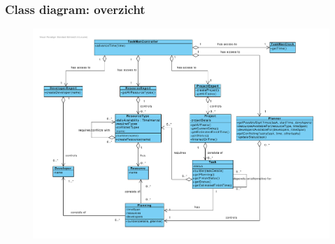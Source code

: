 \documentclass{beamer}
\begin{document}
\begin{frame}
\frametitle {Class diagram: overzicht}
\vspace{-1.4cm}
\begin{figure}
\centering
\begin{center}
\includegraphics[width=1.05\textwidth]{figures/Class diagram iteratie2.pdf}
\end{center}

\end{figure}
\end{frame}

%
%   
%
\end{document}
